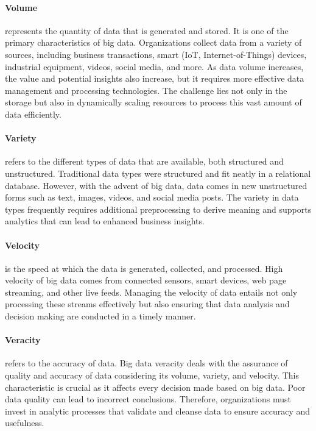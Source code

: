 \paragraph*{Volume} represents the quantity of data that is generated and stored. It is one of the primary characteristics of big data. Organizations collect data from a variety of sources, including business transactions, smart (IoT, Internet-of-Things) devices, industrial equipment, videos, social media, and more. As data volume increases, the value and potential insights also increase, but it requires more effective data management and processing technologies. The challenge lies not only in the storage but also in dynamically scaling resources to process this vast amount of data efficiently.

\paragraph*{Variety} refers to the different types of data that are available, both structured and unstructured. Traditional data types were structured and fit neatly in a relational database. However, with the advent of big data, data comes in new unstructured forms such as text, images, videos, and social media posts. The variety in data types frequently requires additional preprocessing to derive meaning and supports analytics that can lead to enhanced business insights.

\paragraph*{Velocity} is the speed at which the data is generated, collected, and processed. High velocity of big data comes from connected sensors, smart devices, web page streaming, and other live feeds. Managing the velocity of data entails not only processing these streams effectively but also ensuring that data analysis and decision making are conducted in a timely manner.

\paragraph*{Veracity} refers to the accuracy of data. Big data veracity deals with the assurance of quality and accuracy of data considering its volume, variety, and velocity. This characteristic is crucial as it affects every decision made based on big data. Poor data quality can lead to incorrect conclusions. Therefore, organizations must invest in analytic processes that validate and cleanse data to ensure accuracy and usefulness.

